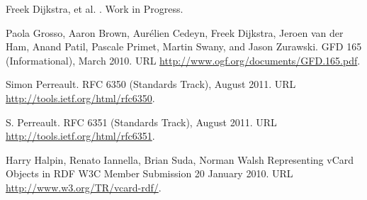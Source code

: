 \begin{thebibliography}{10}
\vspace*{-3em}

Freek Dijkstra, et al.
.
\newblock Work in Progress.

Paola Grosso, Aaron Brown, Aur\'elien Cedeyn, Freek Dijkstra, Jeroen van der Ham, Anand Patil, Pascale Primet, Martin Swany, and Jason Zurawski.
\newblock GFD 165 (Informational), March 2010.
\newblock URL \url{http://www.ogf.org/documents/GFD.165.pdf}.

Simon Perreault.
\newblock RFC 6350 (Standards Track), August 2011.
\newblock URL \url{http://tools.ietf.org/html/rfc6350}.

S. Perreault.
\newblock RFC 6351 (Standards Track), August 2011.
\newblock URL \url{http://tools.ietf.org/html/rfc6351}.

 Harry Halpin, Renato Iannella, Brian Suda, Norman Walsh
\newblock Representing vCard Objects in RDF
\newblock W3C Member Submission 20 January 2010.
\newblock URL \url{http://www.w3.org/TR/vcard-rdf/}.


\end{thebibliography}
